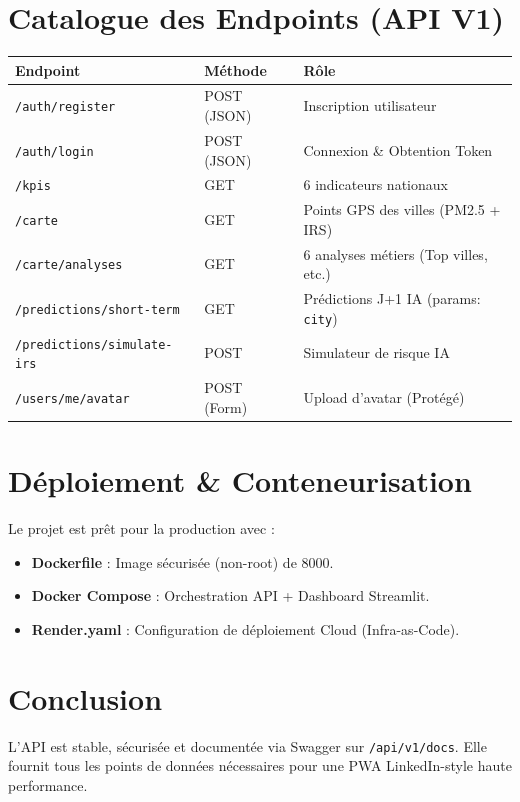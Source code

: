 \documentclass[11pt,a4paper]{article}
\begin{document}
\section{Catalogue des Endpoints (API V1)}

\begin{table}[h]
\centering
\begin{tabular}{@{}lll@{}}
\toprule
\textbf{Endpoint} & \textbf{Méthode} & \textbf{Rôle} \\ \midrule
\texttt{/auth/register} & POST (JSON) & Inscription utilisateur \\
\texttt{/auth/login} & POST (JSON) & Connexion \& Obtention Token \\
\texttt{/kpis} & GET & 6 indicateurs nationaux \\
\texttt{/carte} & GET & Points GPS des villes (PM2.5 + IRS) \\
\texttt{/carte/analyses} & GET & 6 analyses métiers (Top villes, etc.) \\
\texttt{/predictions/short-term} & GET & Prédictions J+1 IA (params: \texttt{city}) \\
\texttt{/predictions/simulate-irs} & POST & Simulateur de risque IA \\
\texttt{/users/me/avatar} & POST (Form) & Upload d'avatar (Protégé) \\ \bottomrule
\end{tabular}
\end{table}

\section{Déploiement \& Conteneurisation}
Le projet est prêt pour la production avec :
\begin{itemize}
    \item \textbf{Dockerfile} : Image sécurisée (non-root) de 8000.
    \item \textbf{Docker Compose} : Orchestration API + Dashboard Streamlit.
    \item \textbf{Render.yaml} : Configuration de déploiement Cloud (Infra-as-Code).
\end{itemize}

\section{Conclusion}
L'API est stable, sécurisée et documentée via Swagger sur \texttt{/api/v1/docs}. Elle fournit tous les points de données nécessaires pour une PWA LinkedIn-style haute performance.
\end{document}
